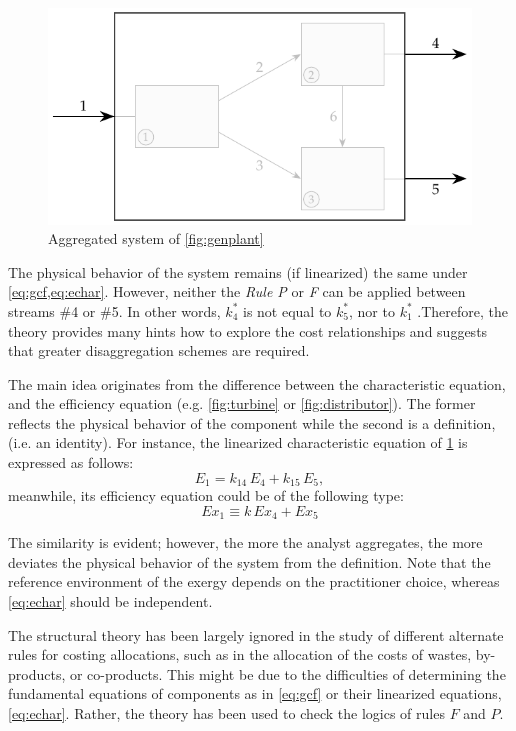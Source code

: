 \documentclass[energies,article,submit,moreauthors,pdftex]{Definitions/mdpi}
\begin{document}
\begin{figure}[h]
    \centering
    \includegraphics[scale=0.9]{genplanta}
    \caption{Aggregated system of \cref{fig:genplant}}
    \label{fig:genplanta}
\end{figure}
The physical behavior of the system remains (if linearized) the same under \cref{eq:gcf,eq:echar}. However, neither the \emph{Rule P} or \emph{F} can be applied between streams \#4 or \#5. In other words, $k_4^*$ is not equal to $k_5^*$, nor to $k_1^*$ .Therefore, the theory provides many hints how to explore the cost relationships and suggests that greater disaggregation schemes are required.

The main idea originates from the difference between the characteristic equation, and the efficiency equation (e.g. \cref{fig:turbine} or \cref{fig:distributor}). The former reflects the physical behavior of the component while the second is a definition, (i.e. an identity). For instance, the linearized characteristic equation of \cref{fig:genplanta} is expressed as follows:
\[
    E_1=k_{14}\,E_4 + k_{15}\,E_5,
\]
meanwhile, its efficiency equation could be of the following type:
\[
   Ex_{1} \equiv k\,Ex_{4}+Ex_{5}
\]

The similarity is evident; however, the more the analyst aggregates, the more deviates the physical behavior of the system from the definition. Note that the reference environment of the exergy depends on the practitioner choice, whereas \cref{eq:echar} should be independent.

The structural theory \cite{Valero1992a,Valero1993} has been largely ignored in the study of different alternate rules for costing allocations, such as in the allocation of the costs of wastes, by-products, or co-products. This might be due to the difficulties of determining the fundamental equations of components as in \cref{eq:gcf} or their linearized equations, \cref{eq:echar}. Rather, the theory has been used to check the logics of rules $F$ and $P$.
\end{document}
